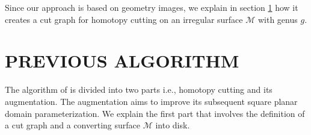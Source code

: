 \documentclass[a4paper,twoside]{article}
\begin{document}
Since our approach is based on geometry images, we explain in section \ref{sec:previous algorithm} how it creates a cut graph for homotopy cutting on an irregular surface $\mathscr{M}$ with genus $g$.
\section{\uppercase{Previous Algorithm}}
\label{sec:previous algorithm}
\noindent The algorithm of \cite{Gu:2002:GI:566654.566589} is divided into two parts i.e., homotopy cutting and its augmentation. The augmentation aims to improve its subsequent square planar domain parameterization. We explain the first part that involves the definition of a cut graph and a converting surface $\mathscr{M}$ into disk.

\begin{figure}[t]
	\centering		
	\hspace{10pt}
	\hspace{10pt}
	\hspace{10pt}
	\hspace{10pt}		

\end{figure}
\end{document}
